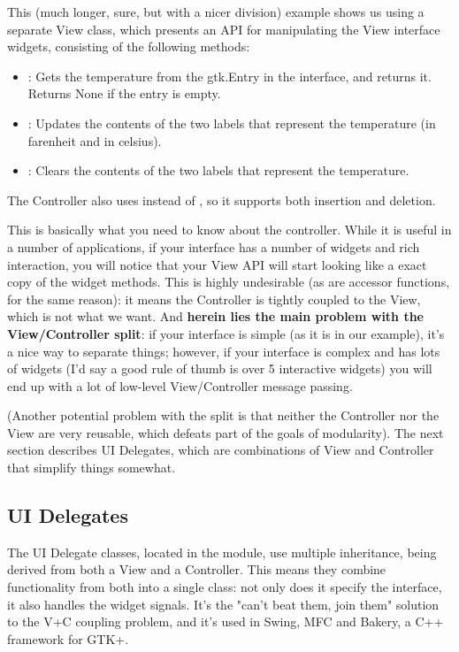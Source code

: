 \documentclass[a4paper]{howto}
\begin{document}


This (much longer, sure, but with a nicer division) example shows us
using a separate View class, which presents an API for manipulating the
View interface widgets, consisting of the following methods:

\begin{itemize}
\item {}: Gets the temperature from the gtk.Entry in the
interface, and returns it. Returns None if the entry is empty.
\item {}: Updates the contents of the two labels that
represent the temperature (in farenheit and in celsius).
\item {}: Clears the contents of the two labels that
represent the temperature.
\end{itemize}

The Controller also uses  instead of ,
so it supports both insertion and deletion.

This is basically what you need to know about the controller. While it
is useful in a number of applications, if your interface has a number of
widgets and rich interaction, you will notice that your View API will
start looking like a exact copy of the widget methods. This is highly
undesirable (as are accessor functions, for the same reason): it means
the Controller is tightly coupled to the View, which is not what we
want. And {\bf herein lies the main problem with the View/Controller
split}: if your interface is simple (as it is in our example), it's a
nice way to separate things; however, if your interface is complex and
has lots of widgets (I'd say a good rule of thumb is over 5 interactive
widgets) you will end up with a lot of low-level View/Controller message
passing.

(Another potential problem with the split is that neither the Controller
nor the View are very reusable, which defeats part of the goals of
modularity). The next section describes UI Delegates, which are
combinations of View and Controller that simplify things somewhat.

\subsection{UI Delegates}

The UI Delegate classes, located in the  module, use
multiple inheritance, being derived from both a View and a Controller.
This means they combine functionality from both into a single class: not
only does it specify the interface, it also handles the widget signals.
It's the "can't beat them, join them" solution to the V+C coupling
problem, and it's used in Swing, MFC and Bakery, a C++ framework for
GTK+.
\end{document}
